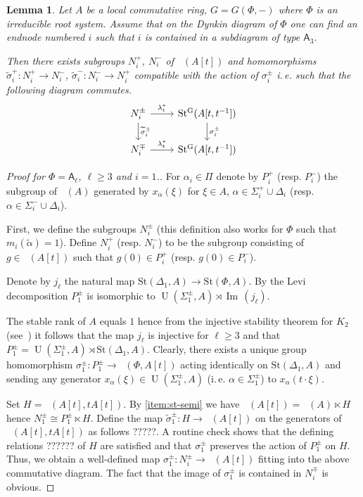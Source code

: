\documentclass[oneside,12pt]{amsart}
\numberwithin{equation}{section}
\newtheorem{lem}{Lemma}
\numberwithin{lem}{section}
\theoremstyle{definition}
\theoremstyle{remark}
\DeclareMathOperator{\UU}{U}
\DeclareMathOperator{\St}{St^G}
\DeclareMathOperator{\im}{Im\,}
\newcommand{\Stb}{\mathrm{St}}
\newcommand{\rA}{\mathsf{A}}
\begin{document}
\begin{lem} \label{lem:sigma}
 Let $A$ be a local commutative ring, $G = G(\Phi, -)$ where $\Phi$ is an irreducible root system.
 Assume that on the Dynkin diagram of $\Phi$ one can find an endnode numbered $i$ such that $i$ is contained in a subdiagram of type $\rA_3$.

 Then there exists subgroups $N_i^+$, $N_i^-$ of $\St(A[t])$ and homomorphisms $\widetilde{\sigma}_i^+ \colon N_i^+ \to N_i^-$, $\widetilde{\sigma}_i^-\colon N_i^- \to N_i^+$
 compatible with the action of $\sigma_i^\pm$ i.\,e. such that the following diagram commutes.
 \[\begin{tikzcd} N_i^\pm \arrow[r, "\lambda_t^*"] \arrow[d, "\widetilde{\sigma}_i^\pm"]          &  \St(A[t, t^{-1}]) \ar[d, "\sigma_i^\pm"] \\
                  N_i^\mp \arrow[r, "\lambda_t^*"] &  \St(A[t, t^{-1}]) \end{tikzcd}\]

\end{lem}

\begin{proof}[Proof for $\Phi=\rA_\ell$, $\ell\geq 3$ and $i=1$.]
 For $\alpha_i\in\Pi$ denote by $P_i^+$ (resp. $P_i^-$) the subgroup of $\St(A)$ generated by 
 $x_\alpha(\xi)$ for $\xi \in A$, $\alpha\in\Sigma_i^+ \cup \Delta_i$ (resp. $\alpha\in\Sigma_i^- \cup \Delta_i$).

 First, we define the subgroups $N_i^\pm$ (this definition also works for $\Phi$ such that $m_i(\widetilde{\alpha})=1$).
 Define $N_{i}^+$ (resp. $N_i^-$) to be the subgroup consisting of $g \in \St(A[t])$ such that $g(0) \in P_i^+$ (resp. $g(0) \in P_i^-$).

 Denote by $j_\ell$ the natural map $\Stb(\Delta_1, A)\to \Stb(\Phi, A)$.
 By the Levi decomposition $P_1^\pm$ is isomorphic to $\UU(\Sigma_1^\pm, A) \rtimes \im(j_\ell)$.

 The stable rank of $A$ equals $1$ hence from the injective stability theorem for $K_2$ (see~\cite[Theorem~4.1]{ST76}) it follows that the map $j_\ell$ is injective for $\ell \geq 3$
 and that $P_1^\pm = \UU(\Sigma_1^\pm, A) \rtimes \Stb(\Delta_1,A)$.
 Clearly, there exists a unique group homomorphism $\sigma_1^\pm \colon P_1^\pm \to \St(\Phi, A[t])$ acting identically on $\Stb(\Delta_1, A)$ and sending
 any generator $x_\alpha(\xi) \in \UU(\Sigma_1^\pm, A)$ (i.\,e. $\alpha\in\Sigma_1^\pm$) to $x_\alpha(t\cdot \xi)$.

 
 Set $H=\St(A[t], tA[t])$.
 By \cref{item:st-semi} we have $\St(A[t]) = \St(A) \ltimes H$ hence $N_1^\pm \cong P_1^\pm \ltimes H.$
 Define the map $\widetilde{\sigma}^\pm_1 \colon H \to \St(A[t])$ on the generators of $\St(A[t], tA[t])$ as follows ?????.
 A routine check shows that the defining relations ?????? of $H$ are satisfied and that $\sigma_1^\pm$ preserves the action of $P_1^\pm$ on $H$.
 Thus, we obtain a well-defined map $\sigma_1^\pm:N_i^\pm \to \St(A[t])$ fitting into the above commutative diagram.
 The fact that the image of $\sigma_1^\pm$ is contained in $N_i^\mp$ is obvious. 
 \renewcommand{\qedsymbol}{} \end{proof}
\end{document}
